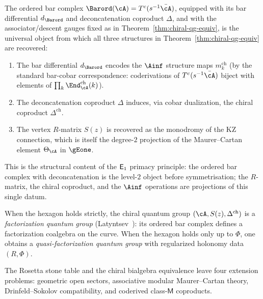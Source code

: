 \begin{corollary}
\label{cor:bar-encodes-all-structural}
The ordered bar complex $\Barord(\cA) = T^c(s^{-1}\bar{\cA})$,
equipped with its bar differential $d_{\Barord}$ and
deconcatenation coproduct $\Delta$, and with the associator/descent
gauges fixed as in Theorem~\textup{\ref{thm:chiral-qg-equiv}}, is the universal
object from which all three structures in
Theorem~\textup{\ref{thm:chiral-qg-equiv}} are recovered:
\begin{enumerate}[label=\textup{(\roman*)}]
\item The bar differential $d_{\Barord}$ encodes the
 $\Ainf$ structure maps $m_k^{\mathrm{ch}}$
 \textup{(}by the standard bar-cobar correspondence:
 coderivations of $T^c(s^{-1}\bar{\cA})$ biject with
 elements of $\prod_k \End^{\mathrm{ch}}_\cA(k)$\textup{)}.
\item The deconcatenation coproduct $\Delta$ induces,
 via cobar dualization, the chiral coproduct
 $\Delta^{\mathrm{ch}}$.
\item The vertex $R$-matrix $S(z)$ is recovered as the
 monodromy of the KZ connection, which is itself the
 degree-$2$ projection of the Maurer--Cartan element
 $\Theta_\cA$ in $\gEone$.
\end{enumerate}
This is the structural content of the $\mathsf{E}_1$ primacy
principle: the ordered bar complex with deconcatenation is the
level-$2$ object before symmetrisation; the $R$-matrix, the chiral
coproduct, and the $\Ainf$ operations are projections of
this single datum.
\end{corollary}

\begin{remark}
\label{rem:factorization-qg}
When the hexagon holds strictly, the chiral quantum group
$(\cA, S(z), \Delta^{\mathrm{ch}})$ is a
\emph{factorization quantum group}
(Latyntsev~\cite{Latyntsev23}): its ordered bar complex
defines a factorization coalgebra on the curve. When the
hexagon holds only up to $\Phi$, one obtains a
\emph{quasi-factorization quantum group} with regularized
holonomy data $(R, \Phi)$.
\end{remark}




\bigskip
The Rosetta stone table and the chiral bialgebra equivalence
leave four extension problems: geometric open sectors, associative
modular Maurer--Cartan theory, Drinfeld--Sokolov compatibility, and
coderived class-$\mathsf{M}$ coproducts.

